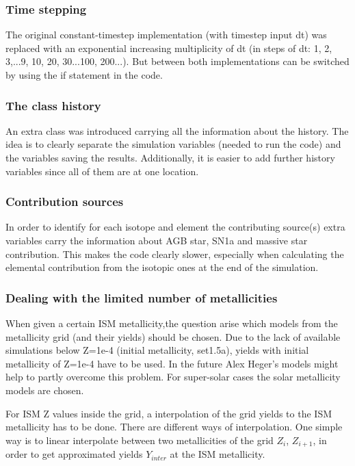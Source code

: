 \subsubsection{Time stepping}

The original constant-timestep implementation
(with timestep input dt) was replaced with
an exponential increasing multiplicity of
dt (in steps of dt: 1, 2, 3,...9, 10, 20, 30...100, 200...).
But between both implementations can be switched
by using the if statement in the code.



\subsubsection{The class history}

An extra class was introduced carrying
all the information about the history.
The idea is to clearly separate the 
simulation variables (needed to run
the code) and the variables saving
the results. Additionally, it is easier
to add further history variables since all
of them are at one location.

\subsubsection{Contribution sources}

In order to identify for each isotope and element
the contributing source(s) extra variables carry
the information about AGB star, SN1a and massive
star contribution. This makes the code clearly
slower, especially when calculating the elemental
contribution from the isotopic ones at the end
of the simulation.

\subsubsection{Dealing with the limited number of metallicities}

When given a certain ISM metallicity,the question arise which
models from the metallicity grid (and their yields) should be chosen.
Due to the lack of available simulations below Z=1e-4 (initial metallicity, set1.5a),
yields with initial metallicity of Z=1e-4 have to be used. In
the future Alex Heger's models might help to partly overcome this problem.
For super-solar cases the solar metallicity models are chosen.

For ISM Z values inside the grid, a interpolation of the grid yields
to the ISM metallicity has to be done.
There are different ways of interpolation. One simple way
is to linear interpolate between two metallicities of the grid 
$Z_i$, $Z_{i+1}$,
in order to get approximated yields $Y_{inter}$ at the ISM metallicity.

